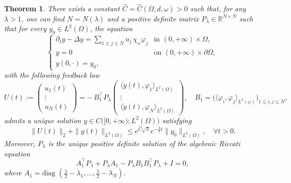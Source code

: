 \documentclass[a4paper]{article}
\newtheorem{theorem}{Theorem}[section]
\numberwithin{equation}{section}
\begin{document}
\begin{theorem}\label{finite-dim}
There exists a constant $\widehat C=\widehat C(\Omega,d,\omega)>0$ such that, for any $\lambda>1$, one can find  $N=N(\lambda)$ and a positive definite matrix $P_\lambda\in\mathbb R^{N\times N}$ such that for every $y_0\in L^2(\Omega)$, the equation
\begin{equation}\label{closed-loop-low-freq}
\begin{cases}
\partial_ty-\Delta y=\displaystyle\sum_{1\le j\le N}u_j\,\chi_\omega\varphi_j&\text{in }(0,+\infty)\times\Omega ,\\[1mm]
y=0&\text{on }(0,+\infty)\times\partial\Omega ,\\[1mm]
y(0,\cdot)=y_0,
\end{cases}
\end{equation}
with the following feedback law
\begin{equation}\label{feedback-control-low-freq}
U(t):=\begin{pmatrix}u_1(t)\\\vdots\\u_N(t)\end{pmatrix}=-\,B_1^\top P_\lambda\begin{pmatrix}\langle y(t),\varphi_1\rangle_{L^2(\Omega)}\\\vdots\\\langle y(t),\varphi_N\rangle_{L^2(\Omega)}\end{pmatrix},\quad B_1=\bigl(\langle \varphi_i,\varphi_j\rangle_{L^2(\omega)}\bigr)_{1\le i,j\le N},
\end{equation}
admits a unique solution $y\in C\bigl([0,+\infty);L^2(\Omega)\bigr)$ satisfying
\begin{equation}\label{exp-decay-est}
\|U(t)\|_{2}+\|y(t)\|_{L^2(\Omega)}\le e^{\widehat C\sqrt{\lambda}}e^{-\frac\lambda 2 t}\|y_0\|_{L^2(\Omega)},\quad \forall t>0.
\end{equation}
Moreover, $P_\lambda$ is the unique positive definite solution of the algebraic Riccati equation
\begin{equation}\label{ARE-low-freq}
A_1^\top P_\lambda+P_\lambda A_1-P_\lambda B_1B_1^\top P_\lambda+I=0,
\end{equation}
where $A_1=\text{diag }(\frac \lambda 2-\lambda_1,\dots,\frac\lambda 2-\lambda_N)$. 
\end{theorem}
\end{document}
